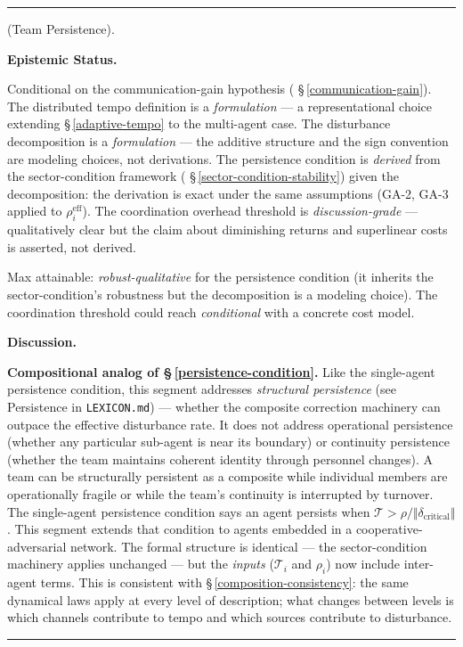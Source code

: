 \documentclass[11pt,oneside]{article}
\newcounter{claim}[section]
\renewcommand{\theclaim}{\thesection.\arabic{claim}}
\newenvironment{segment}[2]{%
  \refstepcounter{claim}%
  \bigskip\noindent\hrule\smallskip
  \noindent{\bfseries #1~\theclaim}\enskip(#2).\par\smallskip
  \noindent\ignorespaces
}{%
  \par\smallskip\noindent\hrule\bigskip
}
\newenvironment{proposition}[1][]{\begin{segment}{Proposition}{#1}}{\end{segment}}
\begin{document}
\begin{proposition}[Team Persistence]
\medskip\noindent\textbf{Epistemic Status.}


Conditional on the communication-gain hypothesis ( \S\,\ref{communication-gain}). The distributed tempo definition is a \textit{formulation} — a representational choice extending \S\,\ref{adaptive-tempo} to the multi-agent case. The disturbance decomposition is a \textit{formulation} — the additive structure and the sign convention are modeling choices, not derivations. The persistence condition is \textit{derived} from the sector-condition framework ( \S\,\ref{sector-condition-stability}) given the decomposition: the derivation is exact under the same assumptions (GA-2, GA-3 applied to $\rho_i^{\text{eff}}$). The coordination overhead threshold is \textit{discussion-grade} — qualitatively clear but the claim about diminishing returns and superlinear costs is asserted, not derived.

Max attainable: \textit{robust-qualitative} for the persistence condition (it inherits the sector-condition's robustness but the decomposition is a modeling choice). The coordination threshold could reach \textit{conditional} with a concrete cost model.


\medskip\noindent\textbf{Discussion.}


\textbf{Compositional analog of \S\,\ref{persistence-condition}.} Like the single-agent persistence condition, this segment addresses \textit{structural persistence} (see Persistence in \texttt{LEXICON.md}) — whether the composite correction machinery can outpace the effective disturbance rate. It does not address operational persistence (whether any particular sub-agent is near its boundary) or continuity persistence (whether the team maintains coherent identity through personnel changes). A team can be structurally persistent as a composite while individual members are operationally fragile or while the team's continuity is interrupted by turnover. The single-agent persistence condition says an agent persists when $\mathcal{T} > \rho / \Vert\delta_{\text{critical}}\Vert$. This segment extends that condition to agents embedded in a cooperative-adversarial network. The formal structure is identical — the sector-condition machinery applies unchanged — but the \textit{inputs} ($\mathcal T_i$ and $\rho_i$) now include inter-agent terms. This is consistent with \S\,\ref{composition-consistency}: the same dynamical laws apply at every level of description; what changes between levels is which channels contribute to tempo and which sources contribute to disturbance.


\end{proposition}
\end{document}
